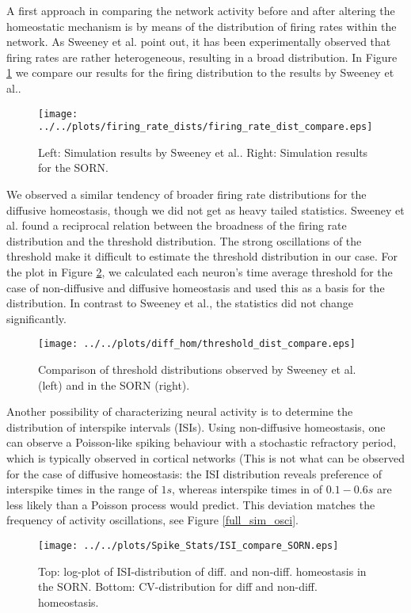 \documentclass[10pt,a4paper]{article}
\begin{document}
A first approach in comparing the network activity before and after altering the homeostatic mechanism is by means of the distribution of firing rates within the network. As Sweeney et al. point out, it has been experimentally observed that firing rates are rather heterogeneous, resulting in a broad distribution. In Figure \ref{firing_rate_dist_comp} we compare our results for the firing distribution to the results by Sweeney et al.. 
\begin{figure}
\texttt{[image: ../../plots/firing\_rate\_dists/firing\_rate\_dist\_compare.eps]}
\caption{Left: Simulation results by Sweeney et al.. Right: Simulation results for the SORN.}
\label{firing_rate_dist_comp}
\end{figure}
We observed a similar tendency of broader firing rate distributions for the diffusive homeostasis, though we did not get as heavy tailed statistics. Sweeney et al. found a reciprocal relation between the broadness of the firing rate distribution and the threshold distribution. The strong oscillations of the threshold make it difficult to estimate the threshold distribution in our case. For the plot in Figure \ref{thresh_dist_comp}, we calculated each neuron's time average threshold for the case of non-diffusive and diffusive homeostasis and used this as a basis for the distribution. In contrast to Sweeney et al., the statistics did not change significantly.
\begin{figure}
\texttt{[image: ../../plots/diff\_hom/threshold\_dist\_compare.eps]}
\caption{Comparison of threshold distributions observed by Sweeney et al. (left) and in the SORN (right).}
\label{thresh_dist_comp}
\end{figure}



Another possibility of characterizing neural activity is to determine the distribution of interspike intervals (ISIs). Using non-diffusive homeostasis, one can observe a Poisson-like spiking behaviour with a stochastic refractory period, which is typically observed in cortical networks (This is not what can be observed for the case of diffusive homeostasis: the ISI distribution reveals preference of interspike times in the range of $1s$, whereas interspike times in of $0.1-0.6s$ are less likely than a Poisson process would predict. This deviation matches the frequency of activity oscillations, see Figure \ref{full_sim_osci}.
\begin{figure}
\texttt{[image: ../../plots/Spike\_Stats/ISI\_compare\_SORN.eps]}
\caption{Top: log-plot of ISI-distribution of diff. and non-diff. homeostasis in the SORN. Bottom: CV-distribution for diff and non-diff. homeostasis.}
\label{ISI_compare}
\end{figure}
\end{document}
